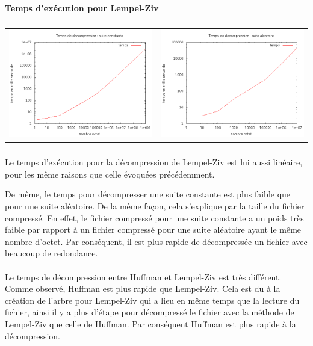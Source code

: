 \documentclass{report}
\begin{document}
\newpage
\paragraph*{}
\textbf{Temps d’exécution pour Lempel-Ziv}
\subparagraph*{}
\hspace{-2cm}\begin{tabular}{l | l}
\includegraphics[width=7cm]{tempsDlzC.png} & 
\includegraphics[width=7cm]{tempsDlzA.png}
\end{tabular}
\subparagraph*{}

Le temps d'exécution pour la décompression de Lempel-Ziv est lui aussi linéaire, pour les même raisons que celle évoquées précédemment.

De même, le temps pour décompresser une suite constante est plus faible que pour une suite aléatoire. De la même façon, cela s'explique par la taille du fichier compressé. En effet, le fichier compressé pour une suite constante a un poids très faible par rapport à un fichier compressé pour une suite aléatoire ayant le même nombre d'octet. Par conséquent, il est plus rapide de décompressée un fichier avec beaucoup de redondance.

\paragraph*{}
Le temps de décompression entre Huffman et Lempel-Ziv est très différent. Comme observé, Huffman est plus rapide que Lempel-Ziv. Cela est du à la création de l'arbre pour Lempel-Ziv qui a lieu en même temps que la lecture du fichier, ainsi il y a plus d'étape pour décompressé le fichier avec la méthode de Lempel-Ziv que celle de Huffman. Par conséquent Huffman est plus rapide à la décompression.
\end{document}
